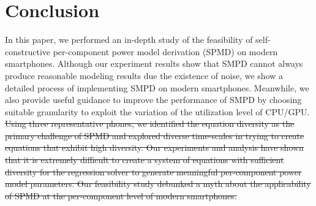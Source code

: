 \section{Conclusion}
\label{sec:conc}

In this paper, we performed an in-depth study of the feasibility of
self-constructive per-component power model derivation (SPMD) on
modern smartphones. {\color{blue}Although our experiment results show that SMPD cannot always produce reasonable modeling results due the existence of noise, we show a detailed process of implementing SMPD on modern smartphones. Meanwhile, we also provide useful guidance to improve the performance of SMPD by choosing suitable granularity to exploit the variation of the utilization level of CPU/GPU.}
\st{Using three representative phones, we identified the
equation diversity as the primary challenge of SPMD and explored
diverse time-scales in trying to create equations that exhibit high
diversity.  Our experiments and analysis have shown that it is
extremely difficult to create a system of equations with sufficient diversity for
the regression solver to generate meaningful per-component power model
parameters.  Our feasibility study debunked a myth about the
applicability of SPMD at the per-component level of modern smartphones.}